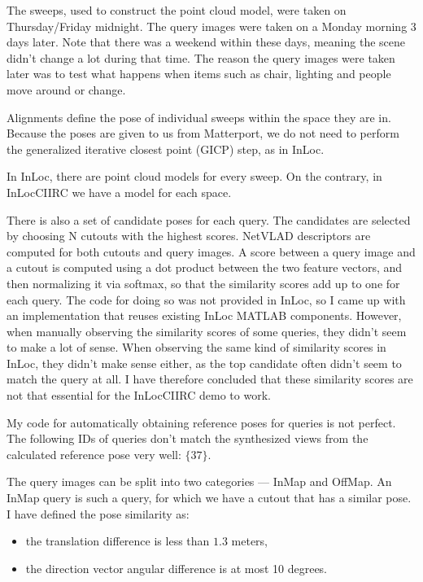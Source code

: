 \documentclass[twoside]{ctuthesis}
\theoremstyle{plain}
\theoremstyle{definition}
\theoremstyle{note}
\begin{document}
The sweeps, used to construct the point cloud model, were taken on Thursday/Friday midnight. The query images were taken on a Monday morning 3 days later. Note that there was a weekend within these days, meaning the scene didn't change a lot during that time. The reason the query images were taken later was to test what happens when items such as chair, lighting and people move around or change.

Alignments define the pose of individual sweeps within the space they are in. Because the poses are given to us from Matterport, we do not need to perform the generalized iterative closest point (GICP) step, as in InLoc.

In InLoc, there are point cloud models for every sweep. On the contrary, in InLocCIIRC we have a model for each space.

There is also a set of candidate poses for each query. The candidates are selected by choosing N cutouts with the highest scores. NetVLAD \cite{Arandjelovic16} descriptors are computed for both cutouts and query images. A score between a query image and a cutout is computed using a dot product between the two feature vectors, and then normalizing it via softmax, so that the similarity scores add up to one for each query. The code for doing so was not provided in InLoc, so I came up with an implementation that reuses existing InLoc MATLAB components. However, when manually observing the similarity scores of some queries, they didn't seem to make a lot of sense. When observing the same kind of similarity scores in InLoc, they didn't make sense either, as the top candidate often didn't seem to match the query at all. I have therefore concluded that these similarity scores are not that essential for the InLocCIIRC demo to work.

My code for automatically obtaining reference poses for queries is not perfect. The following IDs of queries don't match the synthesized views from the calculated reference pose very well: $\{37\}$.

The query images can be split into two categories --- InMap and OffMap. An InMap query is such a query, for which we have a cutout that has a similar pose. I have defined the pose similarity as:

\begin{itemize}
	\item the translation difference is less than $1.3$ meters,
	\item the direction vector angular difference is at most 10 degrees.
\end{itemize}
\end{document}
